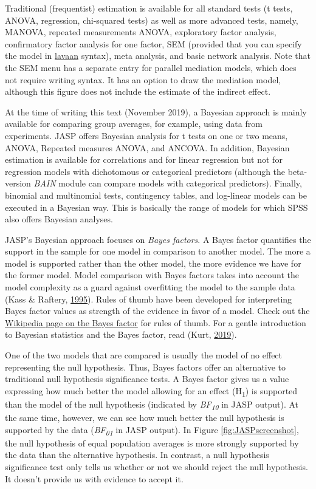 \documentclass[
  english,
  doc]{apa6}
\begin{document}
Traditional (frequentist) estimation is available for all standard tests (t tests, ANOVA, regression, chi-squared tests) as well as more advanced tests, namely, MANOVA, repeated measurements ANOVA, exploratory factor analysis, confirmatory factor analysis for one factor, SEM (provided that you can specify the model in \href{http://lavaan.ugent.be/}{lavaan} syntax), meta analysis, and basic network analysis. Note that the SEM menu has a separate entry for parallel mediation models, which does not require writing syntax. It has an option to draw the mediation model, although this figure does not include the estimate of the indirect effect.

At the time of writing this text (November 2019), a Bayesian approach is mainly available for comparing group averages, for example, using data from experiments. JASP offers Bayesian analysis for t tests on one or two means, ANOVA, Repeated measures ANOVA, and ANCOVA. In addition, Bayesian estimation is available for correlations and for linear regression but not for regression models with dichotomous or categorical predictors (although the beta-version \emph{BAIN} module can compare models with categorical predictors). Finally, binomial and multinomial tests, contingency tables, and log-linear models can be executed in a Bayesian way. This is basically the range of models for which SPSS also offers Bayesian analyses.

JASP's Bayesian approach focuses on \emph{Bayes factors}. A Bayes factor quantifies the support in the sample for one model in comparison to another model. The more a model is supported rather than the other model, the more evidence we have for the former model. Model comparison with Bayes factors takes into account the model complexity as a guard against overfitting the model to the sample data (Kass \& Raftery, \protect\hyperlink{ref-kassBayesFactors1995}{1995}). Rules of thumb have been developed for interpreting Bayes factor values as strength of the evidence in favor of a model. Check out the \href{https://en.wikipedia.org/wiki/Bayes_factor\#Interpretation}{Wikipedia page on the Bayes factor} for rules of thumb. For a gentle introduction to Bayesian statistics and the Bayes factor, read (Kurt, \protect\hyperlink{ref-kurtBayesianStatisticsFun2019}{2019}).

One of the two models that are compared is usually the model of no effect representing the null hypothesis. Thus, Bayes factors offer an alternative to traditional null hypothesis significance tests. A Bayes factor gives us a value expressing how much better the model allowing for an effect (H\textsubscript{1}) is supported than the model of the null hypothesis (indicated by \emph{BF\textsubscript{10}} in JASP output). At the same time, however, we can see how much better the null hypothesis is supported by the data (\emph{BF\textsubscript{01}} in JASP output). In Figure \ref{fig:JASPscreenshot}, the null hypothesis of equal population averages is more strongly supported by the data than the alternative hypothesis. In contrast, a null hypothesis significance test only tells us whether or not we should reject the null hypothesis. It doesn't provide us with evidence to accept it.
\end{document}
